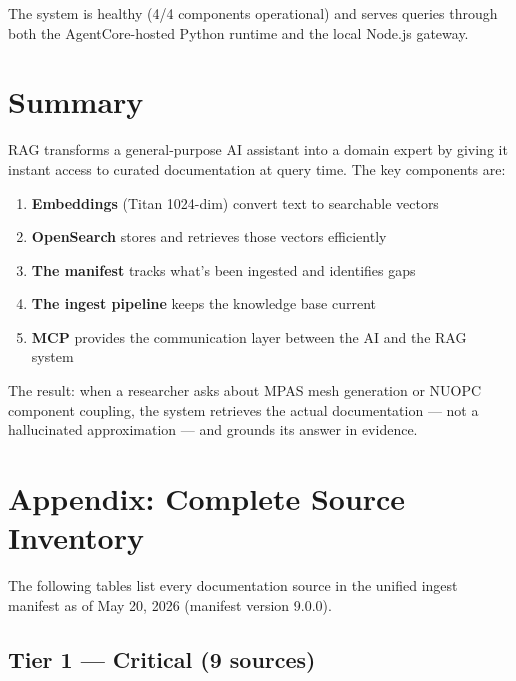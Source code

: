 \documentclass[11pt,letterpaper]{article}
\begin{document}
The system is healthy (4/4 components operational) and serves queries
through both the AgentCore-hosted Python runtime and the local Node.js
gateway.

\section{Summary}

RAG transforms a general-purpose AI assistant into a domain expert by
giving it instant access to curated documentation at query time. The
key components are:

\begin{enumerate}[nosep]
    \item \textbf{Embeddings} (Titan 1024-dim) convert text to
    searchable vectors
    \item \textbf{OpenSearch} stores and retrieves those vectors
    efficiently
    \item \textbf{The manifest} tracks what's been ingested and
    identifies gaps
    \item \textbf{The ingest pipeline} keeps the knowledge base current
    \item \textbf{MCP} provides the communication layer between the AI
    and the RAG system
\end{enumerate}

The result: when a researcher asks about MPAS mesh generation or NUOPC
component coupling, the system retrieves the actual documentation —
not a hallucinated approximation — and grounds its answer in evidence.

\newpage

\appendix
\section{Appendix: Complete Source Inventory}
\label{app:inventory}

The following tables list every documentation source in the unified
ingest manifest as of May 20, 2026 (manifest version 9.0.0).

\subsection{Tier 1 — Critical (9 sources)}
\end{document}
